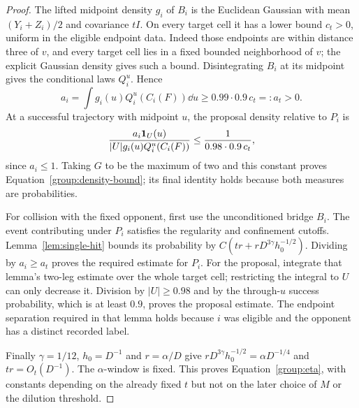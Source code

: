 \begin{proof}
The lifted midpoint density $g_i$ of $B_i$ is the Euclidean Gaussian with
mean $(Y_i+Z_i)/2$ and covariance $tI$.  On every target cell it has
a lower bound $c_t>0$, uniform in the eligible endpoint data.  Indeed
those endpoints are within distance three of $v$, and every target
cell lies in a fixed bounded neighborhood of $v$; the explicit
Gaussian density gives such a bound.  Disintegrating $B_i$ at its
midpoint gives the conditional laws $Q_i^u$.  Hence
\[
 a_i=\int g_i(u)Q_i^u(C_i(F))\dd u
 \ge 0.99\cdot0.9\,c_t=:a_t>0.
\]
At a successful trajectory with midpoint $u$, the proposal density
relative to $P_i$ is
\[
 \frac{a_i\mathbf 1_U(u)}{|U|g_i(u)Q_i^u(C_i(F))}
 \le \frac1{0.98\cdot0.9\,c_t},
\]
since $a_i\le1$.  Taking $G$ to be the maximum of two and this
constant proves Equation~\eqref{group:density-bound}; its final
identity holds because both measures are probabilities.

For collision with the fixed opponent, first use the unconditioned
bridge $B_i$.  The event contributing under $P_i$ satisfies the
regularity and confinement cutoffs.  Lemma~\ref{lem:single-hit}
bounds its probability by
$C(tr+rD^{3\gamma}h_0^{-1/2})$.  Dividing by $a_i\ge a_t$
proves the required estimate for $P_i$.
For the proposal, integrate that lemma's two-leg estimate over the
whole target cell; restricting the integral to $U$ can only decrease
it.  Division by $|U|\ge0.98$ and by the through-$u$ success
probability, which is at least $0.9$, proves the proposal estimate.
The endpoint separation required in that lemma holds because $i$ was
eligible and the opponent has a distinct recorded label.

Finally $\gamma=1/12$, $h_0=D^{-1}$ and $r=\alpha/D$ give
$rD^{3\gamma}h_0^{-1/2}=\alpha D^{-1/4}$ and $tr=O_t(D^{-1})$.
The $\alpha$-window is fixed.  This proves
Equation~\eqref{group:eta}, with constants depending on the already
fixed $t$ but not on the later choice of $M$ or the dilution threshold.
\end{proof}

